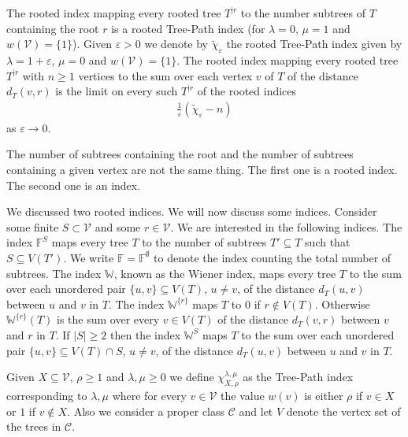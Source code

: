 \documentclass[11 pt]{modarticle}
\newcommand{\vset}{\mathcal{V}}
\newcommand{\wmap}{w}
\newcommand{\size}[1]{|#1|}
\newcommand{\distance}[3]{d_{#3}(#1,#2)}
\newcommand{\rtree}[2]{{#1}^{\lvert #2}}
\newcommand{\tclass}{\mathcal{C}}
\begin{document}
The rooted index mapping every rooted tree $\rtree{T}{r}$ to the number subtrees of $T$ containing the root $r$ is a rooted Tree-Path index (for $\lambda = 0$, $\mu = 1$ and $\wmap(\vset) = \{1\}$). Given $\varepsilon > 0$ we denote by $\widetilde{\chi}_{\varepsilon}$ the rooted Tree-Path index given by $\lambda = 1 + \varepsilon$, $\mu = 0$ and $\wmap(\vset) = \{1\}$. The rooted index mapping every rooted tree $\rtree{T}{r}$ with $n \geq 1$ vertices to the sum over each vertex $v$ of $T$ of the distance $\distance{v}{r}{T}$ is the limit on every such $\rtree{T}{r}$ of the rooted indices
\begin{eqnarray*}
	\frac{1}{\varepsilon}(\widetilde{\chi}_{\varepsilon} - n)
\end{eqnarray*}
as $\varepsilon \rightarrow 0$.

\begin{rem}
The number of subtrees containing the root and the number of subtrees containing a given vertex are not the same thing. The first one is a rooted index. The second one is an index.
\end{rem}

We discussed two rooted indices. We will now discuss some indices. Consider some finite $S \subset \vset$ and some $r \in \vset$. We are interested in the following indices. The index $\mathbb{F}^S$ maps every tree $T$ to the number of subtrees $T' \subseteq T$ such that $S \subseteq V(T')$. We write $\mathbb{F} = \mathbb{F}^{\emptyset}$ to denote the index counting the total number of subtrees. The index $\mathbb{W}$, known as the Wiener index, maps every tree $T$ to the sum over each unordered pair $\{u,v\} \subseteq V(T)$, $u \neq v$, of the distance $\distance{u}{v}{T}$ between $u$ and $v$ in $T$. The index $\mathbb{W}^{\{r\}}$ maps $T$ to $0$ if $r \notin V(T)$. Otherwise $\mathbb{W}^{\{r\}}(T)$ is the sum over every $v \in V(T)$ of the distance $\distance{v}{r}{T}$ between $v$ and $r$ in $T$. If $\size{S} \geq 2$ then the index $\mathbb{W}^S$ maps $T$ to the sum over each unordered pair $\{u, v\} \subseteq V(T) \cap S$, $u \neq v$, of the distance $\distance{u}{v}{T}$ between $u$ and $v$ in $T$.

Given $X \subseteq \vset$, $\rho \geq 1$ and $\lambda, \mu \geq 0$ we define $\chi^{\lambda, \mu}_{X, \rho}$ as the Tree-Path index corresponding to $\lambda, \mu$ where for every $v \in \vset$ the value $\wmap(v)$ is either $\rho$ if $v \in X$ or $1$ if $v \notin X$. Also we consider a proper class $\tclass$ and let $V$ denote the vertex set of the trees in $\tclass$.
\end{document}

